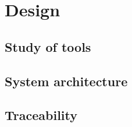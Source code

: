 \chapter{Design}\label{chap:design}

\section{Study of tools}\label{sec:study}

\section{System architecture}\label{sec:architecture}






\section{Traceability}\label{sec:comp-traceability}
